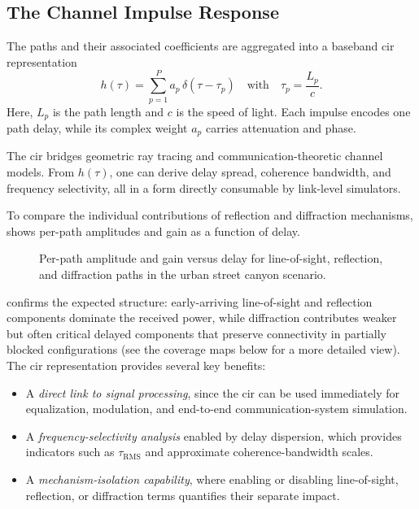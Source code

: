 \subsection{The Channel Impulse Response}

The paths and their associated coefficients are aggregated into a baseband \gls{cir} representation
\begin{equation}
  h(\tau) = \sum_{p=1}^{P} a_p\,\delta\left(\tau - \tau_p\right) \quad\text{with}\quad\tau_p = \frac{L_p}{c}.
\end{equation}
Here, $L_p$ is the path length and $c$ is the speed of light. Each impulse encodes one path delay, while its complex weight $a_p$ carries attenuation and phase.

The \gls{cir} bridges geometric ray tracing and communication-theoretic channel models. From $h(\tau)$, one can derive delay spread, coherence bandwidth, and frequency selectivity, all in a form directly consumable by link-level simulators.

To compare the individual contributions of reflection and diffraction mechanisms,
 shows per-path amplitudes and gain as a function of delay.

\begin{figure}
  \centering
  \caption{Per-path amplitude and gain versus delay for \gls{line-of-sight}, reflection, and diffraction paths in the urban street canyon scenario.}
\end{figure}

 confirms the expected structure: early-arriving \gls{line-of-sight} and reflection components dominate the received power, while diffraction contributes weaker but often critical delayed components that preserve connectivity in partially blocked configurations (see the coverage maps below for a more detailed view). The \gls{cir} representation provides several key benefits:
\begin{itemize}
  \item A \emph{direct link to signal processing}, since the \gls{cir} can be used immediately for equalization, modulation, and end-to-end communication-system simulation.
  \item A \emph{frequency-selectivity analysis} enabled by delay dispersion, which provides indicators such as $\tau_{\mathrm{RMS}}$ and approximate coherence-bandwidth scales.
  \item A \emph{mechanism-isolation capability}, where enabling or disabling \gls{line-of-sight}, reflection, or diffraction terms quantifies their separate impact.
\end{itemize}

